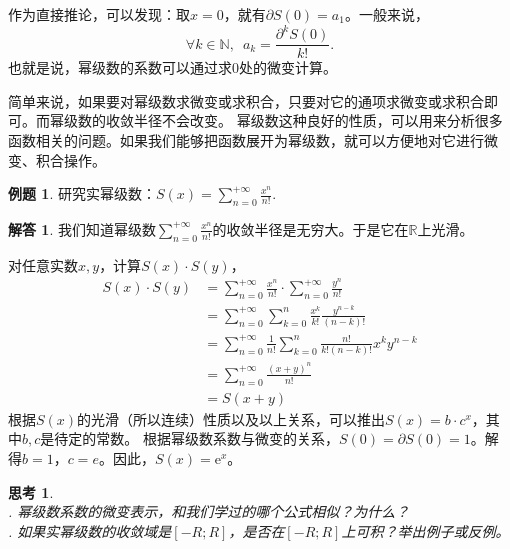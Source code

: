 \documentclass[12pt,UTF8]{ctexbook}
\theoremstyle{definition}
\newtheorem{et}{例题}[section]
\newtheorem*{so}{解答}
\theoremstyle{plain}
\newtheorem{sk}{思考}[section]
\begin{document}
作为直接推论，可以发现：取$x=0$，就有$\partial S(0) = a_1$。一般来说，
$$\forall k\in \mathbb{N}, \,\,\, a_k = \frac{\partial^k S(0)}{k!}.$$
也就是说，幂级数的系数可以通过求$0$处的微变计算。

简单来说，如果要对幂级数求微变或求积合，只要对它的通项求微变或求积合即可。而幂级数的收敛半径不会改变。
幂级数这种良好的性质，可以用来分析很多函数相关的问题。如果我们能够把函数展开为幂级数，就可以方便地对它进行微变、积合操作。

\begin{et}
    研究实幂级数：$S(x) = \sum_{n=0}^{+\infty} \frac{x^n}{n!}. $
\end{et}

\begin{so}
    我们知道幂级数$\sum_{n=0}^{+\infty} \frac{x^n}{n!}$的收敛半径是无穷大。于是它在$\mathbb{R}$上光滑。

    对任意实数$x,y$，计算$S(x)\cdot S(y)$，
    \begin{align*}
        S(x)\cdot S(y) &= \sum_{n=0}^{+\infty} \frac{x^n}{n!} \cdot \sum_{n=0}^{+\infty} \frac{y^n}{n!} \\
        &= \sum_{n=0}^{+\infty} \sum_{k=0}^{n} \frac{x^k}{k!} \frac{y^{n-k}}{(n-k)!} \\
        &= \sum_{n=0}^{+\infty} \frac{1}{n!} \sum_{k=0}^{n} \frac{n!}{k!(n-k)!} x^ky^{n-k} \\
        &= \sum_{n=0}^{+\infty} \frac{(x + y)^n}{n!} \\
        &= S(x + y)
    \end{align*}
    根据$S(x)$的光滑（所以连续）性质以及以上关系，可以推出$S(x) = b\cdot c^x$，其中$b,c$是待定的常数。
    根据幂级数系数与微变的关系，$S(0) = \partial S(0) = 1$。解得$b=1$，$c=e$。因此，$S(x) = \mathrm{e}^x$。
\end{so}


\begin{sk}
    \mbox{} \\
    . 幂级数系数的微变表示，和我们学过的哪个公式相似？为什么？\\
    . 如果实幂级数的收敛域是$[-R;R]$，是否在$[-R;R]$上可积？举出例子或反例。
\end{sk}
\end{document}
